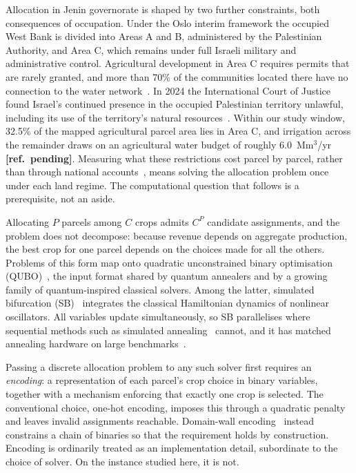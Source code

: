 \documentclass[conference,a4paper]{IEEEtran}
\newcommand{\refpending}{\textbf{[ref.\ pending]}}
\begin{document}
Allocation in Jenin governorate is shaped by two further constraints, both
consequences of occupation. Under the Oslo interim framework the occupied West
Bank is divided into Areas A and B, administered by the Palestinian Authority,
and Area C, which remains under full Israeli military and administrative
control. Agricultural development in Area C requires permits that are rarely
granted, and more than 70\% of the communities located there have no
connection to the water network~\cite{ochaareac}. In 2024 the International
Court of Justice found Israel's continued presence in the occupied Palestinian
territory unlawful, including its use of the territory's natural
resources~\cite{icj2024}. Within our study window, 32.5\% of the mapped
agricultural parcel area lies in Area C, and irrigation across the remainder
draws on an agricultural water budget of roughly 6.0~Mm$^3$/yr \refpending.
Measuring what these restrictions cost parcel by parcel, rather than through
national accounts~\cite{worldbank2014}, means solving the allocation problem
once under each land regime. The computational question that follows is a
prerequisite, not an aside.

Allocating $P$ parcels among $C$ crops admits $C^P$ candidate assignments, and
the problem does not decompose: because revenue depends on aggregate
production, the best crop for one parcel depends on the choices made for all
the others. Problems of this form map onto quadratic unconstrained binary
optimisation (QUBO)~\cite{lucas2014,glover2019}, the input format shared by
quantum annealers and by a growing family of quantum-inspired classical
solvers. Among the latter, simulated bifurcation (SB)~\cite{goto2021} integrates the
classical Hamiltonian dynamics of nonlinear oscillators. All variables
update simultaneously, so SB parallelises where sequential methods such as
simulated annealing~\cite{kirkpatrick1983} cannot, and it has matched
annealing hardware on large benchmarks~\cite{zeng2024}.

Passing a discrete allocation problem to any such solver first requires an
\emph{encoding}: a representation of each parcel's crop choice in binary
variables, together with a mechanism enforcing that exactly one crop is
selected. The conventional choice, one-hot encoding, imposes this through a
quadratic penalty and leaves invalid assignments reachable. Domain-wall
encoding~\cite{chancellor2019} instead constrains a chain of binaries so that
the requirement holds by construction. Encoding is ordinarily treated as an
implementation detail, subordinate to the choice of solver. On the instance
studied here, it is not.
\end{document}
